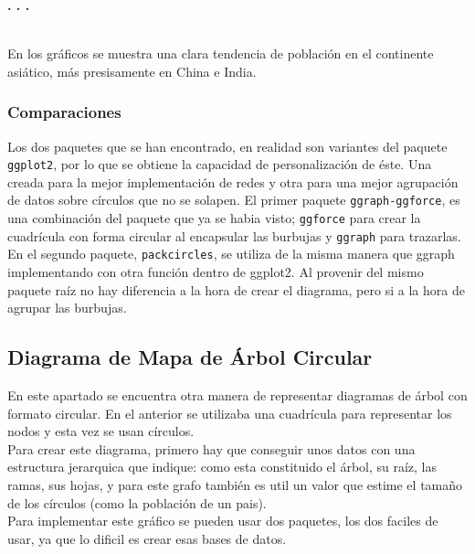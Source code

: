 \documentclass{article}\usepackage[]{graphicx}\usepackage[]{color}
\begin{document}
\begin{center}
\textbf{. . .}
\end{center}
~\\
En los gr\'aficos se muestra una clara tendencia de poblaci\'on en el continente asi\'atico, m\'as presisamente en China e India.
\subsubsection{Comparaciones}
Los dos paquetes que se han encontrado, en realidad son variantes del paquete \texttt{ggplot2}, por lo que se obtiene la capacidad de personalizaci\'on de \'este. Una creada para la mejor implementaci\'on de redes y otra para una mejor agrupaci\'on de datos sobre c\'irculos que no se solapen. El primer paquete \texttt{ggraph-ggforce}, es una combinaci\'on del paquete que ya se habia visto; \texttt{ggforce} para crear la cuadr\'icula con forma circular al encapsular las burbujas y \texttt{ggraph} para trazarlas.~\\
En el segundo paquete, \texttt{packcircles}, se utiliza de la misma manera que ggraph implementando con otra funci\'on dentro de ggplot2. Al provenir del mismo paquete ra\'iz no hay diferencia a la hora de crear el diagrama, pero si a la hora de agrupar las burbujas.
\clearpage
\subsection{Diagrama de Mapa de \'Arbol Circular}\label{ssec:mapaarbol}
En este apartado se encuentra otra manera de representar diagramas de \'arbol con formato circular. En el anterior 
se utilizaba una cuadr\'icula para representar los nodos y esta vez se usan c\'irculos.~\\
Para crear este diagrama, primero hay que conseguir unos datos con una estructura jerarquica que indique: como esta constituido el \'arbol, su ra\'iz, las ramas, sus hojas, y para este grafo tambi\'en es util un valor que estime el tama\~no de los c\'irculos (como la poblaci\'on de un pais).~\\
Para implementar este gr\'afico se pueden usar dos paquetes, los dos faciles de usar, ya que lo dificil es crear esas bases de datos.
\end{document}
